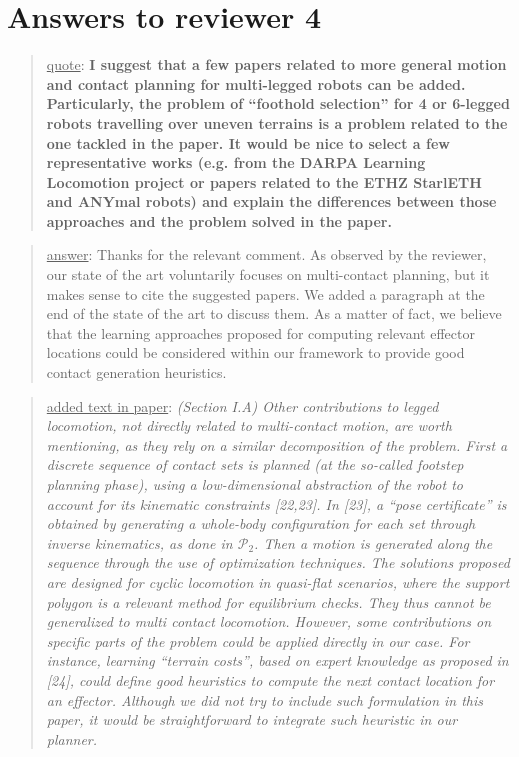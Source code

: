 \documentclass[a4paper]{article}
\newcommand{\done}[0]{}
\newcommand\quot[1]{\begin{quote} \underline{quote}: \textbf{#1}\end{quote}}
\newcommand\as[1]{\begin{quote} \underline{answer}: {#1}\end{quote} }
\newcommand\qt[1]{\begin{quote} \underline{added text in paper}: \textit{#1}\end{quote} \leavevmode \\ }
\begin{document}
\section{Answers to reviewer 4}

\quot{ I suggest that a few papers related to more general motion and contact planning for multi-legged robots can be added. Particularly, the problem of ``foothold selection'' for 4 or 6-legged robots travelling over uneven terrains is a problem related to the one tackled in the paper. It would be nice to select a few representative works (e.g. from the DARPA Learning Locomotion project or
papers related to the ETHZ StarlETH and ANYmal robots) and explain the differences between those approaches and the problem solved in the paper.}
\as{Thanks for the relevant comment. As observed by the reviewer, our state of the art voluntarily focuses on multi-contact planning, but it makes sense to cite the suggested papers. We added a paragraph at the end of the state of the art to discuss them. As a matter of fact, we believe that the learning approaches 
proposed for computing relevant effector locations could be considered within
our framework to provide good contact generation heuristics.}
\qt{(Section I.A) Other contributions to legged locomotion, not directly related to multi-contact motion, are worth mentioning, as they rely on a similar decomposition of the problem. First a discrete sequence 
of contact sets is planned (at the so-called footstep planning phase), using a low-dimensional abstraction of the robot to account for its kinematic constraints [22,23]. In [23], a ``pose certificate'' is obtained by generating a whole-body configuration for each set through inverse kinematics, as done in $\mathcal{P}_2$. Then a
motion is generated along the sequence through the use of optimization techniques. 
The solutions proposed are designed for cyclic locomotion in quasi-flat scenarios, where the support polygon is a relevant method for equilibrium checks. They thus cannot be generalized to multi contact locomotion. 
However, some contributions on specific parts of the problem could be applied directly in our case. 
For instance, learning ``terrain costs'', based on expert knowledge as proposed in [24], could define good heuristics to compute the next contact location for an effector. Although we did not try to include such formulation in this paper, it would be straightforward to integrate such heuristic in our planner.}\done
\end{document}
